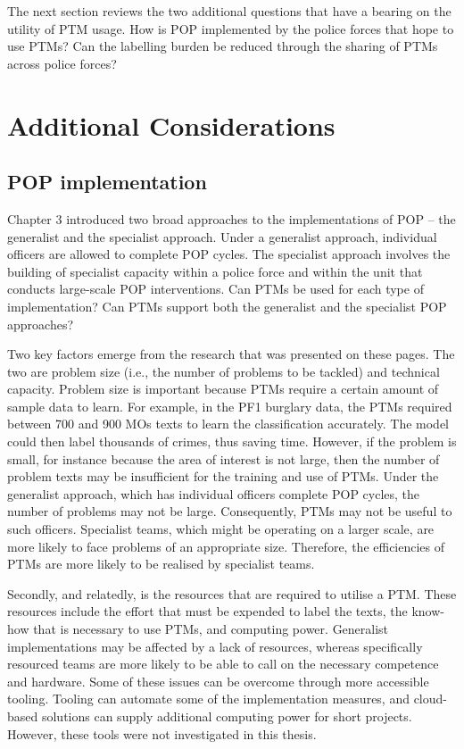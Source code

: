 The next section reviews the two additional questions that have a bearing on the utility of PTM usage. How is POP implemented by the police forces that hope to use PTMs? Can the labelling burden be reduced through the sharing of PTMs across police forces?

 
\section{Additional Considerations}
\subsection{POP implementation} Chapter 3 introduced two broad approaches to the implementations of POP – the generalist and the specialist approach. Under a generalist approach, individual officers are allowed to complete POP cycles. The specialist approach involves the building of specialist capacity within a police force and within the unit that conducts large-scale POP interventions. Can PTMs be used for each type of implementation? Can PTMs support both the generalist and the specialist POP approaches?

Two key factors emerge from the research that was presented on these pages. The two are problem size (i.e., the number of problems to be tackled) and technical capacity. Problem size is important because PTMs require a certain amount of sample data to learn. For example, in the PF1 burglary data, the PTMs required between 700 and 900 MOs texts to learn the classification accurately. The model could then label thousands of crimes, thus saving time. However, if the problem is small, for instance because the area of interest is not large, then the number of problem texts may be insufficient for the training and use of PTMs. Under the generalist approach, which has individual officers complete POP cycles, the number of problems may not be large. Consequently, PTMs may not be useful to such officers. Specialist teams, which might be operating on a larger scale, are more likely to face problems of an appropriate size. Therefore, the efficiencies of PTMs are more likely to be realised by specialist teams.

Secondly, and relatedly, is the resources that are required to utilise a PTM. These resources include the effort that must be expended to label the texts, the know-how that is necessary to use PTMs, and computing power. Generalist implementations may be affected by a lack of resources, whereas specifically resourced teams are more likely to be able to call on the necessary competence and hardware. Some of these issues can be overcome through more accessible tooling. Tooling can automate some of the implementation measures, and cloud-based solutions can supply additional computing power for short projects. However, these tools were not investigated in this thesis.


